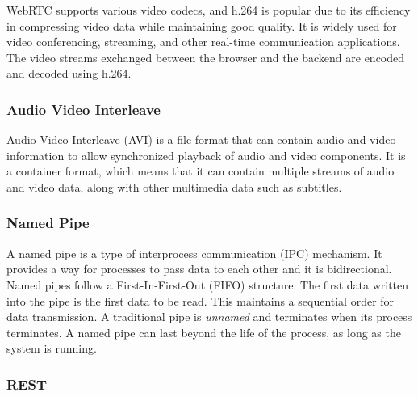 \documentclass[../MasterThesis.tex]{subfiles}
\begin{document}
WebRTC supports various video codecs, and h.264 is popular due to its efficiency in compressing video data while maintaining good quality. It is widely used for video conferencing, streaming, and other real-time communication applications. The video streams exchanged between the browser and the backend are encoded and decoded using h.264.






\subsubsection*{Audio Video Interleave} 

Audio Video Interleave (AVI) is a file format that can contain audio and video information to allow synchronized playback of audio and video components. 
It is a container format, which means that it can contain multiple streams of audio and video data, along with other multimedia data such as subtitles.~\cite{avi}












\subsubsection*{Named Pipe} 

A named pipe is a type of interprocess communication (IPC) mechanism. It provides a way for processes to pass data to each other and it is bidirectional. 
Named pipes follow a First-In-First-Out (FIFO) structure: The first data written into the pipe is the first data to be read. This maintains a sequential order for data transmission.
A traditional pipe is \textit{unnamed} and terminates when its process terminates. A named pipe can last beyond the life of the process, as long as the system is running.~\cite{namedpipe}









\subsubsection*{REST} 
\end{document}
